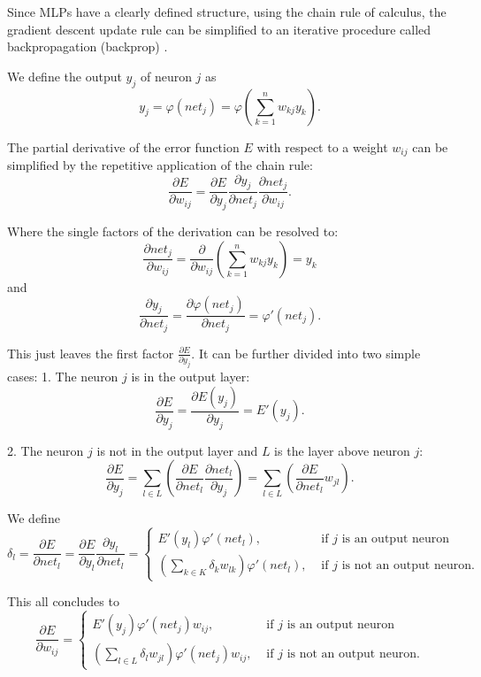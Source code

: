 Since MLPs have a clearly defined structure, using the chain rule of calculus, the gradient descent update rule can be simplified to an iterative procedure called backpropagation (backprop)  \cite{rumelhart1985learning}\cite{Goodfellow-et-al-2016-Book}.

We define the output $y_j$ of neuron $j$ as
\[
	y_j = \varphi(net_j) = \varphi(\sum_{k=1}^n w_{kj} y_k) .
\]
 
The partial derivative of the error function $E$ with respect to a weight $w_{ij}$ can be simplified by the repetitive application of the chain rule:
\[
	\frac{\partial E}{\partial w_{ij}} = \frac{\partial E}{\partial y_j} \frac{\partial y_j}{\partial net_j} \frac{\partial net_j}{\partial w_{ij}} .
\]
 
Where the single factors of the derivation can be resolved to:
\[
	\frac{\partial net_j}{\partial w_{ij}} = \frac{\partial}{\partial w_{ij}} ( \sum_{k=1}^n w_{kj} y_k ) = y_k
\]
and 
\[
	\frac{\partial y_j}{\partial net_j} =  \frac{\partial \varphi(net_j)}{\partial net_j} = \varphi'(net_j).
\]


This just leaves the first factor $\frac{\partial E}{\partial y_j}$. It can be further divided into two simple cases:
1. The neuron $j$ is in the output layer:
\[
\frac{\partial E}{\partial y_j} = \frac{\partial E(y_j)}{\partial y_j} = E'(y_j).
\] 

2. The neuron $j$ is not in the output layer and $L$ is the layer above neuron $j$:
\[
\frac{\partial E}{\partial y_j} = \sum_{l \in L}( \frac{\partial E}{\partial net_l} \frac{\partial net_l}{\partial y_j} )  = \sum_{l \in L}( \frac{\partial E}{\partial net_l} w_{jl} ).
\] 

We define 
\[
\delta_l = \frac{\partial E}{\partial net_l} = \frac{\partial E}{\partial y_l} \frac{\partial y_l}{\partial net_l} =
\begin{cases}
E'(y_l) \varphi'(net_l), & \text{  if } j \text{ is an output neuron} \\
(\sum_{k \in K} \delta_k w_{lk}) \varphi'(net_l), & \text{  if } j \text{ is not an output neuron.}
\end{cases}
\]

This all concludes to 
\[
\frac{\partial E}{\partial w_{ij}} = 
\begin{cases}
E'(y_j) \varphi'(net_j) w_{ij}, & \text{  if } j \text{ is an output neuron} \\
(\sum_{l \in L} \delta_l w_{jl}) \varphi'(net_j) w_{ij}, & \text{  if } j \text{ is not an output neuron.}
\end{cases}
\]


